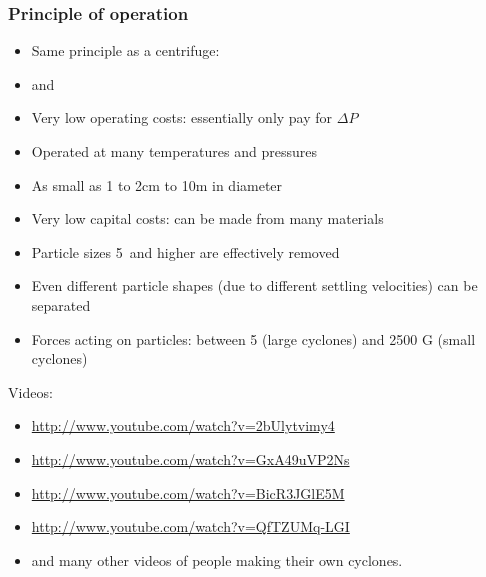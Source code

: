 \begin{frame}\frametitle{Principle of operation}
	\begin{itemize}
		\item	Same principle as a centrifuge: \textbf{{\color{myGreen}{density difference required}}}
		\item	{\color{myOrange}{No moving parts!}} and {\color{myOrange}{no consumable components!}}
		\item	Very low operating costs: essentially only pay for $\Delta P$
		\item	Operated at many temperatures and pressures  %
		\item	As small as 1 to 2cm to 10m in diameter %
		\item	Very low capital costs: can be made from many materials
		\item	Particle sizes 5\micron\, and higher are effectively removed  %
		\item	Even different particle shapes (due to different settling velocities) can be separated
		\item	Forces acting on particles: between 5 (large cyclones) and 2500 G (small cyclones)  %
	\end{itemize}
	\vspace{8pt}
	Videos:
	\begin{itemize}
		\item	\href{http://www.youtube.com/watch?v=2bUlytvimy4}{http://www.youtube.com/watch?v=2bUlytvimy4}
		\item	\href{http://www.youtube.com/watch?v=GxA49uVP2Ns}{http://www.youtube.com/watch?v=GxA49uVP2Ns}
		\item	\href{http://www.youtube.com/watch?v=BicR3JGlE5M}{http://www.youtube.com/watch?v=BicR3JGlE5M}
		\item	\href{http://www.youtube.com/watch?v=QfTZUMq-LGI}{http://www.youtube.com/watch?v=QfTZUMq-LGI}
		\item	and many other videos of people making their own cyclones.
	\end{itemize}
\end{frame}


